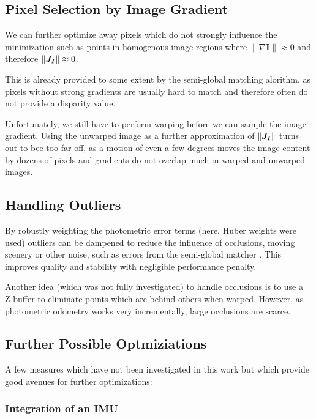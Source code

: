 \subsection{Pixel Selection by Image Gradient}
\label{sec:gradient_filtering}

We can further optimize away pixels which do not strongly influence the
minimization such as points in homogenous image regions where $\lVert \nabla
\mathbf{I} \rVert \approx 0$ and therefore $\lVert \mat{J_I} \rVert \approx 0$.

This is already provided to some extent by the semi-global matching alorithm,
as pixels without strong gradients are usually hard to match and therefore often
do not provide a disparity value.

Unfortunately, we still have to perform warping before we can sample the image
gradient. Using the unwarped image as a further approximation of $\lVert
\mat{J_I} \rVert$ turns out to bee too far off, as a motion of even a few
degrees moves the image content by dozens of pixels and gradients do not
overlap much in warped and unwarped images.

\subsection{Handling Outliers}

By robustly weighting the photometric error terms (here, Huber weights were
used) outliers can be dampened to reduce the influence of occlusions, moving
scenery or other noise, such as errors from the semi-global matcher
\cite{comport2007odometry}. This improves quality and stability with negligible
performance penalty.

Another idea (which was not fully investigated) to handle occlusions is to use a
Z-buffer to eliminate points which are behind others when warped. However, as
photometric odometry works very incrementally, large occlusions are scarce.

\subsection{Further Possible Optmiziations}

A few measures which have not been investigated in this work but which provide
good avenues for further optimizations:

\subsubsection{Integration of an IMU}

